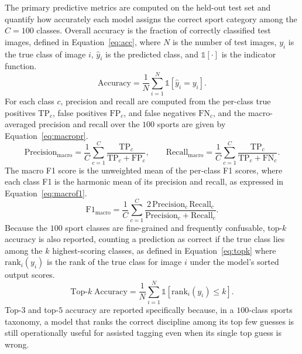The primary predictive metrics are computed on the held-out test set and quantify how accurately each model assigns the correct sport category among the $C=100$ classes.
Overall accuracy is the fraction of correctly classified test images, defined in Equation~\eqref{eq:acc}, where $N$ is the number of test images, $y_i$ is the true class of image $i$, $\hat{y}_i$ is the predicted class, and $\mathbb{1}[\cdot]$ is the indicator function.
\begin{equation}
\label{eq:acc}
\mathrm{Accuracy} = \frac{1}{N}\sum_{i=1}^{N}\mathbb{1}\!\left[\hat{y}_i = y_i\right].
\end{equation}
For each class $c$, precision and recall are computed from the per-class true positives $\mathrm{TP}_c$, false positives $\mathrm{FP}_c$, and false negatives $\mathrm{FN}_c$, and the macro-averaged precision and recall over the $100$ sports are given by Equation~\eqref{eq:macropr}.
\begin{equation}
\label{eq:macropr}
\mathrm{Precision}_{\mathrm{macro}} = \frac{1}{C}\sum_{c=1}^{C}\frac{\mathrm{TP}_c}{\mathrm{TP}_c+\mathrm{FP}_c}, \qquad
\mathrm{Recall}_{\mathrm{macro}} = \frac{1}{C}\sum_{c=1}^{C}\frac{\mathrm{TP}_c}{\mathrm{TP}_c+\mathrm{FN}_c}.
\end{equation}
The macro F1 score is the unweighted mean of the per-class F1 scores, where each class F1 is the harmonic mean of its precision and recall, as expressed in Equation~\eqref{eq:macrof1}.
\begin{equation}
\label{eq:macrof1}
\mathrm{F1}_{\mathrm{macro}} = \frac{1}{C}\sum_{c=1}^{C}\frac{2\,\mathrm{Precision}_c\,\mathrm{Recall}_c}{\mathrm{Precision}_c+\mathrm{Recall}_c}.
\end{equation}
Because the $100$ sport classes are fine-grained and frequently confusable, top-$k$ accuracy is also reported, counting a prediction as correct if the true class lies among the $k$ highest-scoring classes, as defined in Equation~\eqref{eq:topk} where $\mathrm{rank}_i(y_i)$ is the rank of the true class for image $i$ under the model's sorted output scores.
\begin{equation}
\label{eq:topk}
\mathrm{Top}\text{-}k\;\mathrm{Accuracy} = \frac{1}{N}\sum_{i=1}^{N}\mathbb{1}\!\left[\mathrm{rank}_i(y_i) \le k\right].
\end{equation}
Top-$3$ and top-$5$ accuracy are reported specifically because, in a $100$-class sports taxonomy, a model that ranks the correct discipline among its top few guesses is still operationally useful for assisted tagging even when its single top guess is wrong.

